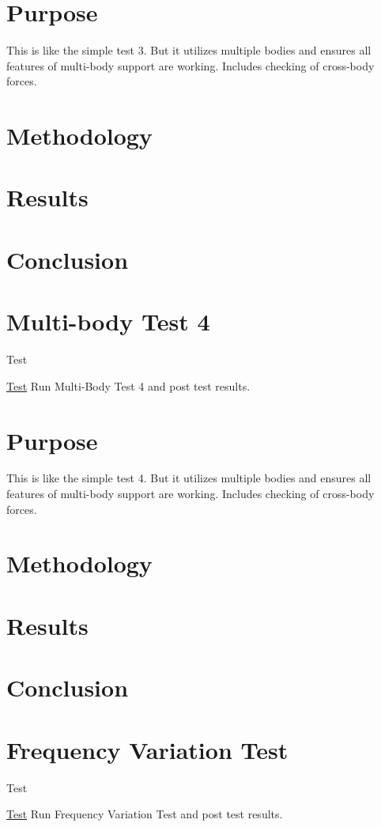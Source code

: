 \section*{Purpose}

This is like the simple test 3. But it utilizes multiple bodies and ensures all features of multi-\/body support are working. Includes checking of cross-\/body forces.

\section*{Methodology}

\section*{Results}

\section*{Conclusion}\hypertarget{MultiBodyTest4}{}\section{Multi-\/body Test 4}\label{MultiBodyTest4}
\begin{DoxyRefDesc}{Test}
\item[\hyperlink{test__test000004}{Test}]Run Multi-\/\-Body Test 4 and post test results.\end{DoxyRefDesc}


\section*{Purpose}

This is like the simple test 4. But it utilizes multiple bodies and ensures all features of multi-\/body support are working. Includes checking of cross-\/body forces.

\section*{Methodology}

\section*{Results}

\section*{Conclusion}\hypertarget{TestFrequency}{}\section{Frequency Variation Test}\label{TestFrequency}
\begin{DoxyRefDesc}{Test}
\item[\hyperlink{test__test000009}{Test}]Run Frequency Variation Test and post test results.\end{DoxyRefDesc}


